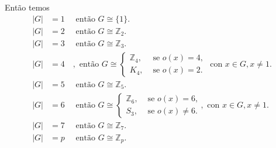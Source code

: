 Então temos
\begin{align*}
  |G|&=1\quad\text{ então }G\cong \{1\}.\\
  |G|&=2\quad\text{ então }G\cong \mathbb{Z}_{2}.\\
  |G|&=3\quad\text{ então }G\cong \mathbb{Z}_{3}.\\
  |G|&=4\quad,\text{ então } G\cong 
  \begin{cases}
    \mathbb{Z}_{4}, &\text{ se } o(x)=4 \text{,} \\
    K_4, &\text{ se } o(x)=2 .
  \end{cases}\, \text{ con }x\in G,x\neq 1.\\
  |G|&=5\quad\text{ então }G\cong \mathbb{Z}_{5}.\\
  |G|&=6\quad\text{ então }G\cong \begin{cases}
    \mathbb{Z}_6, &\text{ se } o(x)=6 \text{,} \\
    S_3, &\text{ se } o(x)\neq 6 .
  \end{cases},\text{ con }x\in G,x\neq 1.\\
  |G|&=7\quad\text{ então }G\cong \mathbb{Z}_{7}.\\
  |G|&=p\quad\text{ então }G\cong \mathbb{Z}_{p}.
\end{align*}
